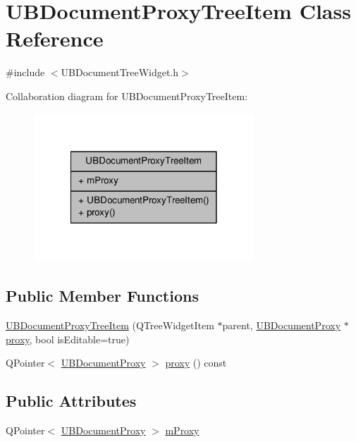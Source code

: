 \hypertarget{class_u_b_document_proxy_tree_item}{\section{U\-B\-Document\-Proxy\-Tree\-Item Class Reference}
\label{d3/d9e/class_u_b_document_proxy_tree_item}
}


{\ttfamily \#include $<$U\-B\-Document\-Tree\-Widget.\-h$>$}



Collaboration diagram for U\-B\-Document\-Proxy\-Tree\-Item\-:
\nopagebreak
\begin{figure}[H]
\begin{center}
\leavevmode
\includegraphics[width=234pt]{da/d2a/class_u_b_document_proxy_tree_item__coll__graph}
\end{center}
\end{figure}
\subsection*{Public Member Functions}
\begin{DoxyCompactItemize}
\item 
\hyperlink{class_u_b_document_proxy_tree_item_ab5eb8efc15b2cfb7cf91aaa72d079e18}{U\-B\-Document\-Proxy\-Tree\-Item} (Q\-Tree\-Widget\-Item $\ast$parent, \hyperlink{class_u_b_document_proxy}{U\-B\-Document\-Proxy} $\ast$\hyperlink{class_u_b_document_proxy_tree_item_a99726e62fcd1c5e3383754903811c00f}{proxy}, bool is\-Editable=true)
\item 
Q\-Pointer$<$ \hyperlink{class_u_b_document_proxy}{U\-B\-Document\-Proxy} $>$ \hyperlink{class_u_b_document_proxy_tree_item_a99726e62fcd1c5e3383754903811c00f}{proxy} () const 
\end{DoxyCompactItemize}
\subsection*{Public Attributes}
\begin{DoxyCompactItemize}
\item 
Q\-Pointer$<$ \hyperlink{class_u_b_document_proxy}{U\-B\-Document\-Proxy} $>$ \hyperlink{class_u_b_document_proxy_tree_item_afd0bd30a03cbabb79b1356c58281a342}{m\-Proxy}
\end{DoxyCompactItemize}


